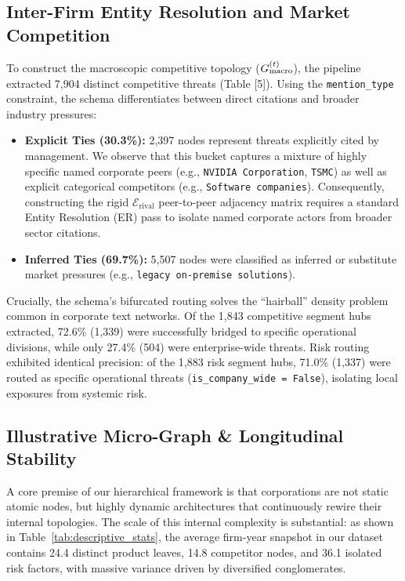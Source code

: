 \subsection{Inter-Firm Entity Resolution and Market Competition}
To construct the macroscopic competitive topology ($G_{\text{macro}}^{(t)}$), the pipeline extracted 7,904 distinct competitive threats (Table [5]). Using the \texttt{mention\_type} constraint, the schema differentiates between direct citations and broader industry pressures:
\begin{itemize}
    \item \textbf{Explicit Ties (30.3\%):} 2,397 nodes represent threats explicitly cited by management. We observe that this bucket captures a mixture of highly specific named corporate peers (e.g., \texttt{NVIDIA Corporation}, \texttt{TSMC}) as well as explicit categorical competitors (e.g., \texttt{Software companies}). Consequently, constructing the rigid $\mathcal{E}_{\text{rival}}$ peer-to-peer adjacency matrix requires a standard Entity Resolution (ER) pass to isolate named corporate actors from broader sector citations.
    \item \textbf{Inferred Ties (69.7\%):} 5,507 nodes were classified as inferred or substitute market pressures (e.g., \texttt{legacy on-premise solutions}).
\end{itemize}

Crucially, the schema's bifurcated routing solves the ``hairball'' density problem common in corporate text networks. Of the 1,843 competitive segment hubs extracted, 72.6\% (1,339) were successfully bridged to specific operational divisions, while only 27.4\% (504) were enterprise-wide threats. Risk routing exhibited identical precision: of the 1,883 risk segment hubs, 71.0\% (1,337) were routed as specific operational threats (\texttt{is\_company\_wide = False}), isolating local exposures from systemic risk.

\subsection{Illustrative Micro-Graph \& Longitudinal Stability}



A core premise of our hierarchical framework is that corporations are not static atomic nodes, but highly dynamic architectures that continuously rewire their internal topologies. The scale of this internal complexity is substantial: as shown in Table~\ref{tab:descriptive_stats}, the average firm-year snapshot in our dataset contains 24.4 distinct product leaves, 14.8 competitor nodes, and 36.1 isolated risk factors, with massive variance driven by diversified conglomerates.

